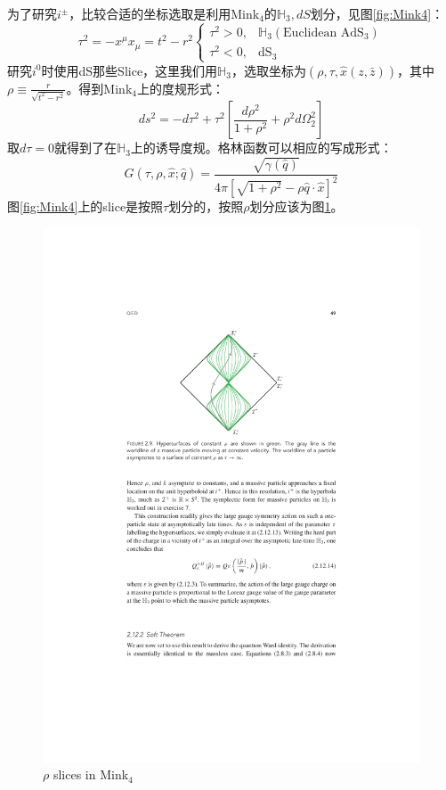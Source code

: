 为了研究$i^\pm$，比较合适的坐标选取是利用Mink$_4$的$\mathbb{H}_3,dS$划分，见图\ref{fig:Mink4}：
\begin{equation}
	\tau^2=-x^\mu x_\mu=t^2-r^2\begin{cases}\tau^2>0,&\mathbb{H}_3(\text{Euclidean AdS}_3)\\\tau^2<0,&\text{dS}_3\end{cases}
\end{equation}
研究$i^0$时使用dS那些Slice，这里我们用$\mathbb{H}_3$，选取坐标为$(\rho,\tau,\hat x (z,\bar z))$，其中$\rho\equiv\frac r{\sqrt{t^2-r^2}}$。得到Mink$_{4}$上的度规形式：
\begin{equation}
ds^2=-d\tau^2+\tau^2\left[\frac{d\rho^2}{1+\rho^2}+\rho^2d\Omega_2^2\right]
\end{equation}
取$d\tau=0$就得到了在$\mathbb{H}_3$上的诱导度规。格林函数可以相应的写成形式：
\begin{equation}
	G(\tau,\rho,\hat{x};\hat{q})=\frac{\sqrt{\gamma(\hat{q})}}{4\pi\left[\sqrt{1+\rho^2}-\rho\hat{q}\cdot\hat{x}\right]^2}
\end{equation}
图\ref{fig:Mink4}上的slice是按照$\tau$划分的，按照$\rho$划分应该为图\ref{fig:11}。
\begin{figure}[htbp]\label{fig:11}
	\centering
	\includegraphics{figs/fig7.pdf}
	\caption{$\rho$ slices in Mink$_{4}$}
\end{figure}
